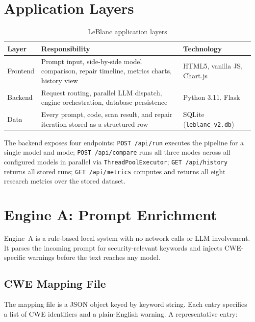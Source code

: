 \documentclass[12pt,a4paper]{report}
\begin{document}
\section{Application Layers}
\label{sec:layers}

\begin{table}[H]
\centering
\caption{LeBlanc application layers}
\label{tab:layers}
\renewcommand{\arraystretch}{1.3}
\begin{tabularx}{\textwidth}{@{}lXl@{}}
\toprule
\textbf{Layer} & \textbf{Responsibility} & \textbf{Technology} \\
\midrule
Frontend & Prompt input, side-by-side model comparison, repair
           timeline, metrics charts, history view
         & HTML5, vanilla JS, Chart.js \\
Backend  & Request routing, parallel LLM dispatch, engine
           orchestration, database persistence
         & Python 3.11, Flask \\
Data     & Every prompt, code, scan result, and repair iteration
           stored as a structured row
         & SQLite (\texttt{leblanc\_v2.db}) \\
\bottomrule
\end{tabularx}
\end{table}

The backend exposes four endpoints: \texttt{POST /api/run} executes the pipeline
for a single model and mode; \texttt{POST /api/compare} runs all three modes
across all configured models in parallel via \texttt{ThreadPoolExecutor};
\texttt{GET /api/history} returns all stored runs; \texttt{GET /api/metrics}
computes and returns all eight research metrics over the stored dataset.

\section{Engine A: Prompt Enrichment}
\label{sec:enginea}

Engine~A is a rule-based local system with no network calls or LLM involvement.
It parses the incoming prompt for security-relevant keywords and injects
CWE-specific warnings before the text reaches any model.

\subsection{CWE Mapping File}

The mapping file is a JSON object keyed by keyword string. Each entry specifies
a list of CWE identifiers and a plain-English warning. A representative entry:
\end{document}
